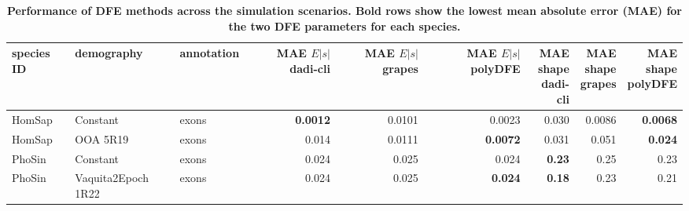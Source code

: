 \documentclass[hidelinks]{article}
\newcommand{\stopsupplement}{%
        \setcounter{table}{0}
        \renewcommand{\thetable}{\arabic{table}}%
        \setcounter{figure}{0}
        \renewcommand{\thefigure}{\arabic{figure}}%
     }
\begin{document}
\begin{table}[ht]
\centering
\small

\caption{\bf{Performance of DFE methods across the simulation scenarios}. 
Bold rows show the lowest mean absolute error (MAE) for the two DFE parameters
for each species.}

\begin{tabular}{lllrrrrrr}
\toprule
species ID & demography & annotation & \makecell{MAE \\ $E|s|$ \\ dadi-cli} & \makecell{MAE \\ $E|s|$ \\ grapes} & \makecell{MAE \\ $E|s|$ \\ polyDFE} & \makecell{MAE \\ shape \\ dadi-cli} & \makecell{MAE \\ shape \\ grapes} & \makecell{MAE \\ shape \\ polyDFE} \\
\midrule
HomSap & Constant & exons & \bf{0.0012} & 0.0101 & 0.0023 & 0.030 & 0.0086 & \bf{0.0068} \\
HomSap & OOA 5R19 & exons & 0.014 & 0.0111 & \bf{0.0072} & 0.031 & 0.051 & \bf{0.024} \\
PhoSin & Constant & exons & 0.024 & 0.025 & 0.024 & \bf{0.23} & 0.25 & 0.23 \\
PhoSin & Vaquita2Epoch 1R22 & exons & 0.024 & 0.025 & \bf{0.024} & \bf{0.18} & 0.23 & 0.21 \\
\bottomrule
\end{tabular}
\label{tab:dfe_table}
\end{table}

\stopsupplement
\end{document}
